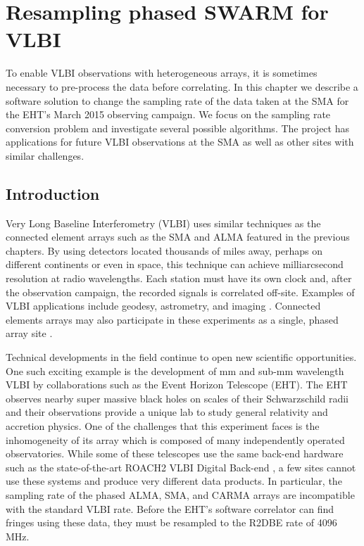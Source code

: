 \newcommand{\z}{\mathpzc{z}}
\newcommand{\falign}{0}
\newcommand{\talign}{7.5}

\chapter{Resampling phased SWARM for VLBI}
\label{chap:aphids}


To enable VLBI observations with heterogeneous arrays, it is sometimes necessary to pre-process
the data before correlating.  In this chapter we describe a software solution to change the 
sampling rate of the data taken at the SMA for the EHT's March 2015 observing campaign.  We 
focus on the sampling rate conversion problem and investigate several possible algorithms.  The project
has applications for future VLBI observations at the SMA as well as other sites with similar 
challenges.

\section{Introduction}

Very Long Baseline Interferometry (VLBI) uses similar techniques as the connected element arrays such as the 
SMA and ALMA
featured in the previous chapters.  By using detectors located thousands of miles away, perhaps on different 
continents or even in space, this technique can achieve milliarcsecond resolution at radio wavelengths.  Each 
station must have its own clock and, after the observation campaign, the recorded signals is correlated off-site. 
Examples of VLBI applications include geodesy, astrometry, and imaging \citep{felli89,sovers98}.  Connected
elements arrays may also participate in these experiments as a single, phased array site \citep{thompson01}.

Technical developments in the field continue to open new scientific opportunities.  One such exciting example 
is the development of mm and sub-mm wavelength VLBI by collaborations such as the Event Horizon
Telescope (EHT).  The EHT observes nearby super massive black holes on scales of their Schwarzschild radii and
their observations provide a unique lab to study general relativity and accretion physics.  One of the 
challenges that this experiment faces is the inhomogeneity of its array which is composed of many independently 
operated observatories.  While some of these telescopes use the same back-end hardware such as the 
state-of-the-art ROACH2 VLBI Digital Back-end \citep[R2DBE;][]{vertatschitsch16}, a few sites 
cannot use these systems and produce very 
different data products. In particular, the sampling rate of the phased ALMA, SMA, and CARMA arrays are 
incompatible with the standard VLBI rate.  Before the EHT's software correlator
\citep[DIFX;][]{deller07} can find fringes using these data, they must be resampled to the R2DBE rate of 
4096\,MHz.  

